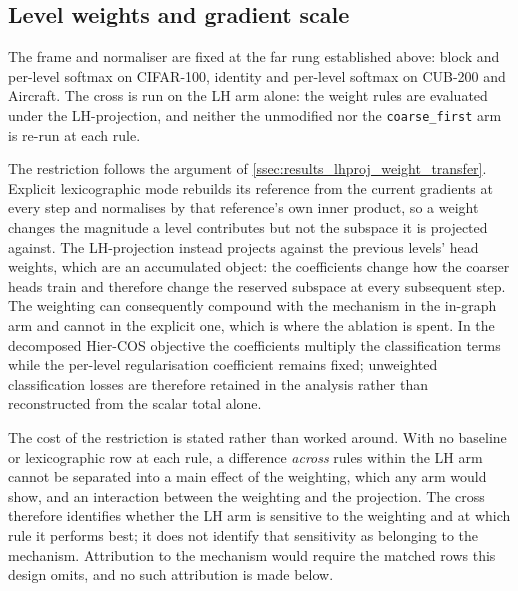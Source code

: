 \subsection{Level weights and gradient scale}
\label{ssec:results_lex_scaling}

The frame and normaliser are fixed at the far rung established above: block and
per-level softmax on CIFAR-100, identity and per-level softmax on CUB-200 and
Aircraft. The cross is run on the LH arm alone: the weight rules are evaluated
under the LH-projection, and neither the unmodified nor the
\texttt{coarse\_first} arm is re-run at each rule.

The restriction follows the argument of
\cref{ssec:results_lhproj_weight_transfer}. Explicit lexicographic mode rebuilds
its reference from the current gradients at every step and normalises by that
reference's own inner product, so a weight changes the magnitude a level
contributes but not the subspace it is projected against. The LH-projection
instead projects against the previous levels' head weights, which are an
accumulated object: the coefficients change how the coarser heads train and
therefore change the reserved subspace at every subsequent step. The weighting
can consequently compound with the mechanism in the in-graph arm and cannot in
the explicit one, which is where the ablation is spent. In the decomposed
Hier-COS objective the coefficients multiply the classification terms while the
per-level regularisation coefficient remains fixed; unweighted classification
losses are therefore retained in the analysis rather than reconstructed from the
scalar total alone.

The cost of the restriction is stated rather than worked around. With no
baseline or lexicographic row at each rule, a difference \emph{across} rules
within the LH arm cannot be separated into a main effect of the weighting, which
any arm would show, and an interaction between the weighting and the projection.
The cross therefore identifies whether the LH arm is sensitive to the weighting
and at which rule it performs best; it does not identify that sensitivity as
belonging to the mechanism. Attribution to the mechanism would require the
matched rows this design omits, and no such attribution is made below.

